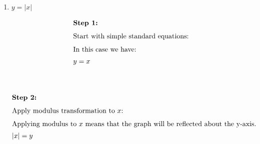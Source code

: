 \begin{enumerate}
\begin{multicols}{2}
\begin{center}
            \end{center}
        \end{multicols}
    
    \item $y=|x|$
        \begin{multicols}{2}
            \begin{align*}
                \intertext{\textbf{Step 1:}}
                \intertext{Start with simple standard equations:}
                \intertext{In this case we have:}
                y &= x\\[10mm]
            \end{align*}
            \begin{center}
            \end{center}
        \end{multicols}
        \begin{multicols}{2}
            \begin{align*}
                \intertext{\textbf{Step 2:}}
                \intertext{Apply modulus transformation to $x$:}
                \intertext{Applying modulus to $x$ means that the graph will be reflected about the y-axis.}
                |x| &= y\\[1mm]
            \end{align*}
            \begin{center}
            \end{center}

\end{multicols}
\end{enumerate}
